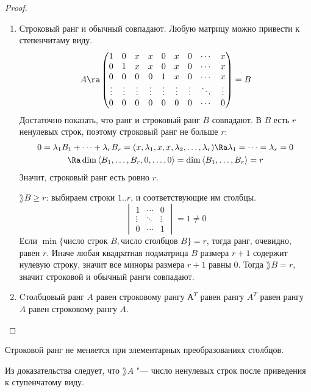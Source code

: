 \begin{proof}
\begin{enumerate}
	\item
		Строковый ранг и обычный совпадают.
		Любую матрицу можно привести к степенчитаму виду.
		\[
			A \ra \begin{pmatrix}
				1 & 0 & x & x & 0 & x & 0 & \cdots & x \\
				0 & 1 & x & x & 0 & x & 0 & \cdots & x \\
				0 & 0 & 0 & 0 & 1 & x & 0 & \cdots & x \\
				\vdots&\vdots&\vdots&\vdots&\vdots&\vdots&\vdots&\ddots&\vdots\\
				0 & 0 & 0 & 0 & 0 & 0 & 0 & \cdots & 0
			\end{pmatrix} = B
		\]
		Достаточно показать, что ранг и строковый ранг $B$ совпадают.
		В $B$ есть $r$ ненулевых строк, поэтому строковый ранг не больше $r$:
		\begin{gather*}
			0 = \lambda_1 B_1 + \dots + \lambda_rB_r = (x, \lambda_1, x, x, \lambda_2, \dots, \lambda_r)
				\Ra \lambda_1 = \dots = \lambda_r = 0 \\
			\Ra \dim \left<B_1, \dots, B_r, 0, \dots, 0\right> = \dim \left<B_1, \dots, B_r\right> = r
		\end{gather*}
		Значит, строковый ранг есть ровно $r$.

		$\rang B \ge r$: выбираем строки $1..r$, и соответствующие им столбцы.
		\[
			\begin{vmatrix}
				1 & \cdots & 0 \\
				\vdots&\ddots&\vdots \\
				0 & \cdots & 1
			\end{vmatrix} = 1 \ne 0
		\]
		Если $\min\{\text{число строк $B$}, \text{число столбцов $B$}\} = r$, тогда ранг, очевидно, равен $r$.
		Иначе любая квадратная подматрица $B$ размера $r + 1$ содержит нулевую строку, значит все миноры размера $r + 1$ равны 0.
		Тогда $\rang B = r$, значит строковой и обычный ранги совпадают.

	\item
		Cтолбцовый ранг $A$ равен строковому рангу $А^T$ равен рангу $A^T$ равен рангу $A$ равен строковому рангу $A$.
	\end{enumerate}
\end{proof}

\begin{conseq}
	Строковой ранг не меняется при элементарных преобразованиях столбцов.
\end{conseq}

\begin{Rem}
	Из доказательства следует, что $\rang A$ "--- число ненулевых строк после приведения к ступенчатому виду.
\end{Rem}


